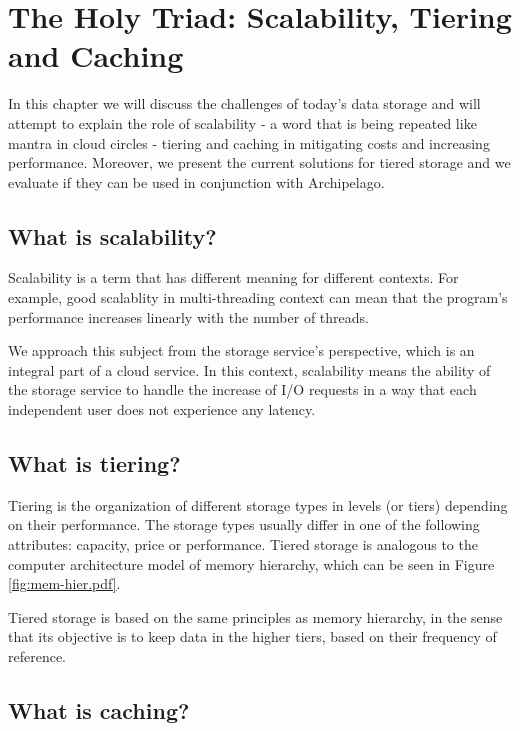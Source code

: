 \chapter{The Holy Triad: Scalability, Tiering and Caching}\label{ch:tiering}

In this chapter we will discuss the challenges of today's data storage and will 
attempt to explain the role of scalability - a word that is being repeated like 
mantra in cloud circles - tiering and caching in mitigating costs and 
increasing performance.  Moreover, we present the current solutions for tiered 
storage and we evaluate if they can be used in conjunction with Archipelago.

\section{What is scalability?}

Scalability is a term that has different meaning for different contexts. For 
example, good scalablity in multi-threading context can mean that the program's 
performance increases linearly with the number of threads.

We approach this subject from the storage service's perspective, which is an 
integral part of a cloud service. In this context, scalability means the 
ability of the storage service to handle the increase of I/O requests in a way 
that each independent user does not experience any latency.

\section{What is tiering?}

Tiering is the organization of different storage types in levels (or tiers) 
depending on their performance.  The storage types usually differ in one of the 
following attributes: capacity, price or performance.  Tiered storage is 
analogous to the computer architecture model of memory hierarchy, which can be 
seen in Figure \ref{fig:mem-hier.pdf}.


Tiered storage is based on the same principles as memory hierarchy, in the 
sense that its objective is to keep data in the higher tiers, based on their 
frequency of reference.

\section{What is caching?}

